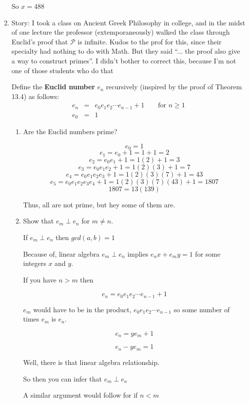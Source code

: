 \documentclass[10pt, AMS Euler]{article}
\newcommand{\primes}{\mathscr{P}}
\begin{document}
\begin{enumerate}
        So $x = 488$

        


        



        \newpage	
		\item Story: I took a class on Ancient Greek Philosophy in college, and in the midst of one lecture the professor (extemporaneously) walked the class through Euclid's proof that $\primes$ is infinite.  
		Kudos to the prof for this, since their specialty had nothing to do with Math.  
		But they said ``... the proof also give a way to construct primes''.  
		I didn't bother to correct this, because I'm not one of those students who do that \smiley
		
		Define the {\bf Euclid number} $e_n$ recursively (inspired by the proof of Theorem 13.4) as follows: 
		\begin{eqnarray*}
			e_n & = & e_0e_1e_2 \cdots e_{n-1} + 1 \;\;\;\;\;\; \mbox{ for $n \geq 1$}\\
			e_0 & = & 1
		\end{eqnarray*}
		
		\begin{enumerate} 
			\item Are the Euclid numbers prime?  

                $$ e_0 = 1 $$
                $$ e_1 = e_0 + 1 = 1 + 1 = 2 $$
                $$ e_2 = e_0 e_1 + 1 = 1(2) + 1 = 3 $$
                $$ e_3 = e_0 e_1 e_2 + 1 = 1(2)(3) + 1 = 7 $$
                $$ e_4 = e_0 e_1 e_2 e_3 + 1 = 1(2)(3)(7) + 1 = 43 $$
                $$ e_5 = e_0 e_1 e_2 e_3 e_4 + 1 = 1(2)(3)(7)(43) + 1 = 1807 $$ 
                $$ 1807 = 13 (139) $$

                Thus, all are not prime, but hey some of them are. 

                
			\item Show that $e_m \perp e_n$ for $m \neq n$.

            If $e_m \perp e_n$ then $gcd(a, b) = 1$

            Because of, linear algebra $e_m \perp e_n$ implies $e_n x + e_m y = 1$ for some integers $x$ and $y$.

            If you have $n>m$ then

            $$ e_n = e_0e_1e_2 \cdots e_{n-1} + 1 $$

            $e_m$ would have to be in the product, $e_0e_1e_2 \cdots e_{n-1}$ so some number of times $e_m$ is $e_n$.

            $$ e_n = y e_m + 1 $$

            $$ e_n - y e_m = 1 $$

            Well, there is that linear algebra relationship.

            So then you can infer that $e_m \perp e_n$

            A similar argument would follow for if $n<m$
            
            
                
                
		\end{enumerate}
	\end{enumerate}
	
	\noindent \underline{\hspace{3in}}\\
	
	
	
	
\end{document}
